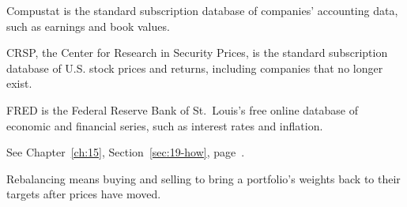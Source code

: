 \begin{keyterms}
\small
\begin{description}[leftmargin=0pt, itemsep=2pt, parsep=0pt, font=\normalfont\bfseries\color{FEMaroon}]
  \item[Compustat.] Compustat is the standard subscription database of companies' accounting data, such as earnings and book values.
  \item[CRSP.] CRSP, the Center for Research in Security Prices, is the standard subscription database of U.S. stock prices and returns, including companies that no longer exist.
  \item[FRED.] FRED is the Federal Reserve Bank of St.~Louis's free online database of economic and financial series, such as interest rates and inflation.
  \item[Open Source Asset Pricing.] See Chapter~\ref{ch:15}, Section~\ref{sec:19-how}, page~\pageref{sec:19-how}.
  \item[Rebalancing.] Rebalancing means buying and selling to bring a portfolio's weights back to their targets after prices have moved.
\end{description}
\end{keyterms}
